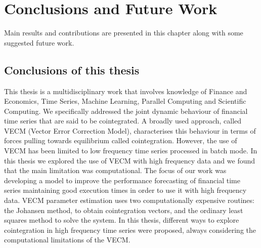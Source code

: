 
\chapter{Conclusions and Future Work}
\label{chapter:conclusions}
Main results and contributions are presented in this chapter along with some
suggested future work.

\vspace{0.5cm} 

\section{Conclusions of this thesis}

This thesis is a multidisciplinary work that involves knowledge of Finance
and Economics, Time Series, Machine Learning, Parallel Computing and Scientific
Computing. We specifically addressed the joint dynamic behaviour of financial time
series that are said to be cointegrated. A broadly used approach, called VECM (Vector
Error Correction Model), characterises this behaviour in terms of forces pulling
towards equilibrium called cointegration. However, the use of VECM has been
limited to low frequency time series processed in batch mode. In this thesis we
explored the use of VECM with high frequency data and we found that the main
limitation was computational. The focus of our work was developing a model to improve the performance forecasting of financial time series maintaining good execution times in order to use it with high frequency data. VECM parameter estimation uses two computationally
expensive routines: the Johansen method, to obtain cointegration vectors, and
the ordinary least squares method to solve the system. In this thesis, different
ways to explore cointegration in high frequency time series were proposed,
always considering the computational limitations of the VECM.

